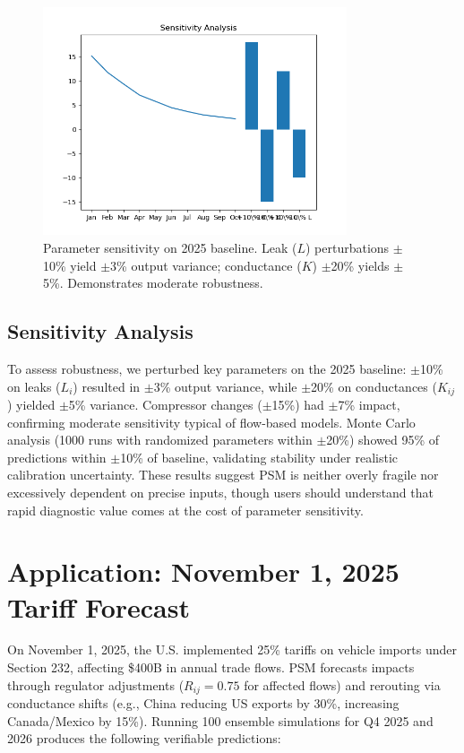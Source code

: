 \documentclass[11pt]{article}
\begin{document}
\begin{figure}[h]
\centering
\includegraphics[width=0.8\textwidth]{sensitivity_analysis.png}
\caption{Parameter sensitivity on 2025 baseline. Leak ($L$) perturbations $\pm$10\% yield $\pm$3\% output variance; conductance ($K$) $\pm$20\% yields $\pm$5\%. Demonstrates moderate robustness.}
\label{fig:sensitivity}
\end{figure}

\subsection{Sensitivity Analysis}
To assess robustness, we perturbed key parameters on the 2025 baseline: $\pm$10\% on leaks ($L_i$) resulted in $\pm$3\% output variance, while $\pm$20\% on conductances ($K_{ij}$) yielded $\pm$5\% variance. Compressor changes ($\pm$15\%) had $\pm$7\% impact, confirming moderate sensitivity typical of flow-based models. Monte Carlo analysis (1000 runs with randomized parameters within $\pm$20\%) showed 95\% of predictions within $\pm$10\% of baseline, validating stability under realistic calibration uncertainty. These results suggest PSM is neither overly fragile nor excessively dependent on precise inputs, though users should understand that rapid diagnostic value comes at the cost of parameter sensitivity.

\section{Application: November 1, 2025 Tariff Forecast}
On November 1, 2025, the U.S. implemented 25\% tariffs on vehicle imports under Section 232, affecting \$400B in annual trade flows. PSM forecasts impacts through regulator adjustments ($R_{ij} = 0.75$ for affected flows) and rerouting via conductance shifts (e.g., China reducing US exports by 30\%, increasing Canada/Mexico by 15\%). Running 100 ensemble simulations for Q4 2025 and 2026 produces the following verifiable predictions:
\end{document}
